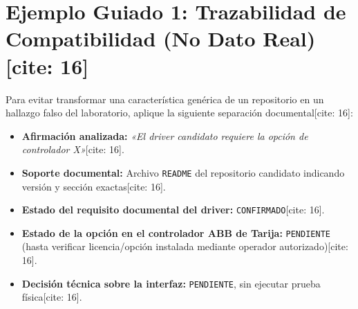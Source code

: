 \documentclass[11pt, a4paper]{article}
\begin{document}
\section{Ejemplo Guiado 1: Trazabilidad de Compatibilidad (No Dato Real)[cite: 16]}
Para evitar transformar una característica genérica de un repositorio en un hallazgo falso del laboratorio, aplique la siguiente separación documental[cite: 16]:
\begin{itemize}
    \item \textbf{Afirmación analizada:} \textit{«El driver candidato requiere la opción de controlador X»}[cite: 16].
    \item \textbf{Soporte documental:} Archivo \texttt{README} del repositorio candidato indicando versión y sección exactas[cite: 16].
    \item \textbf{Estado del requisito documental del driver:} \texttt{CONFIRMADO}[cite: 16].
    \item \textbf{Estado de la opción en el controlador ABB de Tarija:} \texttt{PENDIENTE} (hasta verificar licencia/opción instalada mediante operador autorizado)[cite: 16].
    \item \textbf{Decisión técnica sobre la interfaz:} \texttt{PENDIENTE}, sin ejecutar prueba física[cite: 16].
\end{itemize}
\end{document}
